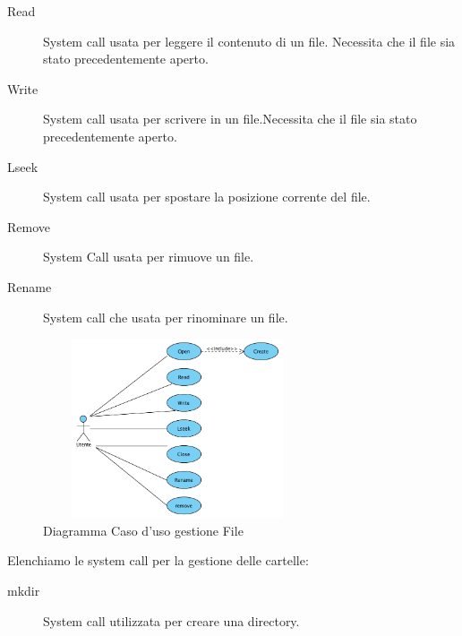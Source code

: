        \begin{description}
        \item[Read] System call usata per leggere il contenuto di un file. Necessita che il file sia stato precedentemente aperto. 
	\end{description}

        \begin{description}
       \item[Write] System call usata per scrivere in un file.Necessita che il file sia stato precedentemente aperto. 
         \end{description}
     \begin{description}
      \item[Lseek] System call usata per spostare la posizione corrente del file.
      \end{description}
    
    \begin{description}
     \item[Remove] System Call usata per rimuove un file.
     \end{description}
     
     \begin{description}
      \item[Rename] System call che usata per rinominare un file.
      \end{description}
    
    \begin{figure}[h]
	\centering
	\includegraphics[width=300px,height=200px]{./Immagini/UseCaseFile.png}
	\caption{Diagramma Caso d'uso gestione File}
	\label{Fig.:UseCaseFile}
    \end{figure}

  \newpage

  Elenchiamo le system call per la gestione delle cartelle: \\

    \begin{description}
     \item[mkdir]System call utilizzata per creare una directory.
     \end{description}
     
